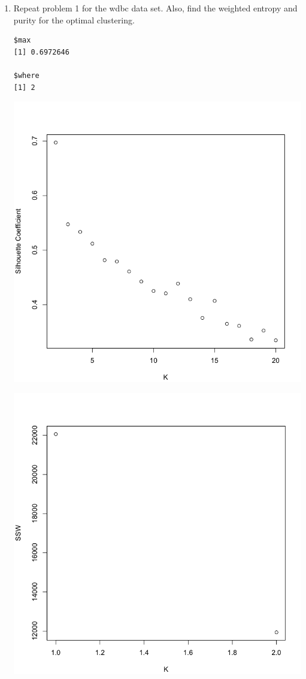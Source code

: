 \documentclass[11pt]{article}
\begin{document}
\begin{enumerate}
\begin{enumerate}
\end{enumerate}

\item 
 Repeat problem 1 for the wdbc data set. Also, find the weighted entropy 
 and purity for the optimal clustering. 

\begin{Verbatim}
$max
[1] 0.6972646

$where
[1] 2
\end{Verbatim}

\begin{center}
\includegraphics[scale=0.35]{pix/sil_vs_k}
\end{center}

\begin{center}
\includegraphics[scale=0.35]{pix/ssw_}
\end{center}


\end{enumerate}
\end{document}
